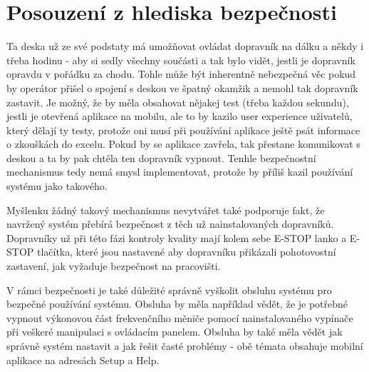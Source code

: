 \section{Posouzení z hlediska bezpečnosti}\label{sec:PosouzeniZHlediskaBezpecnosti}

Ta deska už ze své podstaty má umožňovat ovládat dopravník na dálku a někdy i třeba hodinu - aby si sedly všechny součásti a tak bylo vidět, jestli je dopravník opravdu v pořádku za chodu. Tohle může být inherentně nebezpečná věc pokud by operátor přišel o spojení s deskou ve špatný okamžik a nemohl tak dopravník zastavit. Je možný, že by měla obsahovat nějakej test (třeba každou sekundu), jestli je otevřená aplikace na mobilu, ale to by kazilo user experience uživatelů, který dělají ty testy, protože oni musí při používání aplikace ještě psát informace o zkouškách do excelu. Pokud by se aplikace zavřela, tak přestane komunikovat s deskou a ta by pak chtěla ten dopravník vypnout. Tenhle bezpečnostní mechanismus tedy nemá smysl implementovat, protože by příliš kazil používání systému jako takového.

Myšlenku žádný takový mechanismus nevytvářet také podporuje fakt, že navržený systém přebírá bezpečnost z těch už nainstalovaných dopravníků. Dopravníky už při této fázi kontroly kvality mají kolem sebe E-STOP lanko a E-STOP tlačítka, které jsou nastavené aby dopravníku přikázali pohotovostní zastavení, jak vyžaduje bezpečnost na pracovišti.

V rámci bezpečnosti je také důležité správně vyškolit obsluhu systému pro bezpečné používání systému. Obsluha by měla například vědět, že je potřebné vypnout výkonovou část frekvenčního měniče pomocí nainstalovaného vypínače při veškeré manipulaci s ovládacím panelem. Obsluha by také měla vědět jak správně systém nastavit a jak řešit časté problémy - obě témata obsahuje mobilní aplikace na adresách Setup a Help.